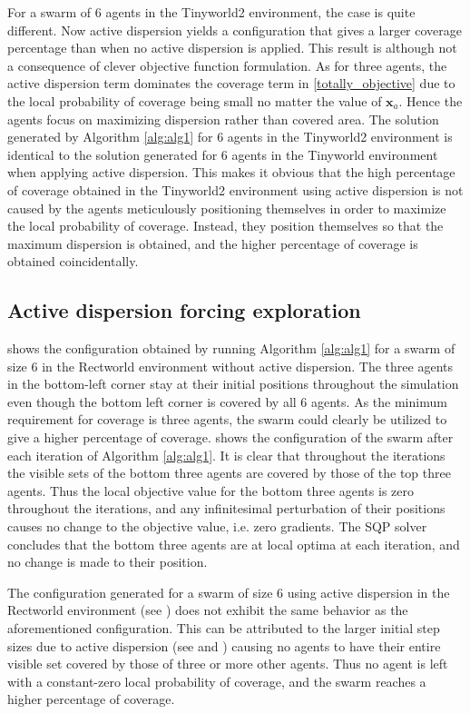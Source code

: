 For a swarm of 6 agents in the Tinyworld2 environment, the case is quite different. Now active dispersion yields a configuration that gives a larger coverage percentage than when no active
dispersion is applied. This result is although not a consequence of clever objective function formulation. As for three agents, the active dispersion term dominates the coverage term
in \eqref{totally_objective} due to the local probability of coverage being small no matter the value of $\mathbf{x}_{a}$. Hence the agents focus on maximizing dispersion rather than covered area. The 
solution generated by Algorithm \ref{alg:alg1} for 6 agents in the Tinyworld2 environment is identical to the solution generated for 6 agents in the Tinyworld environment when applying active dispersion. 
This makes it obvious that the high percentage of coverage obtained in the Tinyworld2 environment using active dispersion is not caused by the agents meticulously positioning themselves in order to maximize the local
probability of coverage. Instead, they position themselves so that the maximum dispersion is obtained, and the higher percentage of coverage is obtained coincidentally.

\subsection{Active dispersion forcing exploration}
 shows the configuration obtained
by running Algorithm \ref{alg:alg1} for a swarm of size 6 in the Rectworld environment  without active dispersion. The three agents in the bottom-left corner stay
at their initial positions throughout the simulation even though the bottom left corner is covered by all 6 agents. As the minimum requirement for coverage is three agents, the swarm could 
clearly be utilized to give a higher percentage of coverage.  shows the configuration of the swarm after each iteration of Algorithm \ref{alg:alg1}. It is clear that 
throughout the iterations the visible sets of the bottom three agents are covered by those of the top three agents. Thus the local objective value for the bottom three agents is zero 
throughout the iterations, and any infinitesimal perturbation of their positions causes no change to the objective value, i.e. zero gradients. The SQP solver concludes that the bottom three agents are at local
optima at each iteration, and no change is made to their position. 

The configuration generated for a swarm of size 6 using active dispersion in the Rectworld environment (see ) does not exhibit the same behavior as the aforementioned configuration. This can be attributed to the
larger initial step sizes due to active dispersion (see  and ) causing no agents to have their entire visible set covered by those of three or more other agents.
Thus no agent is left with a constant-zero local probability of coverage, and the swarm reaches a higher percentage of coverage.

